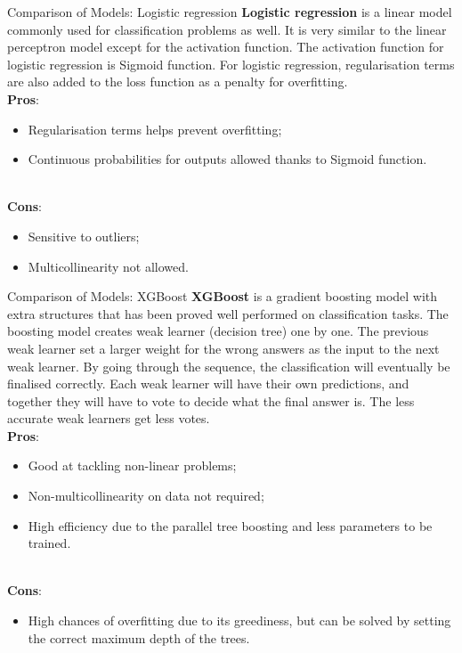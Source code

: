\begin{frame}{Comparison of Models: Logistic regression}
\textbf{Logistic regression} is a linear model commonly used for classification problems as well. It is very similar to the linear perceptron model except for the activation function. The activation function for logistic regression is Sigmoid function. For logistic regression, regularisation terms are also added to the loss function as a penalty for overfitting.
\\  \textbf{Pros}: 
\begin{itemize}
\item Regularisation terms helps prevent overfitting;
\item Continuous probabilities for outputs allowed thanks to Sigmoid function.
\end{itemize}
\\  \textbf{Cons}: 
\begin{itemize}
\item Sensitive to outliers;
\item Multicollinearity not allowed.
\end{itemize}
\end{frame}


\begin{frame}{Comparison of Models: XGBoost}
\textbf{XGBoost} is a gradient boosting model with extra structures that has been proved well performed on classification tasks. The boosting model creates weak learner (decision tree) one by one. The previous weak learner set a larger weight for the wrong answers as the input to the next weak learner. By going through the sequence, the classification will eventually be finalised correctly. Each weak learner will have their own predictions, and together they will have to vote to decide what the final answer is. The less accurate weak learners get less votes.
\\ \textbf{Pros}: 
\begin{itemize}
\item Good at tackling non-linear problems; 
\item Non-multicollinearity on data not required; 
\item High efficiency due to the parallel tree boosting and less parameters to be trained.
\end{itemize}

\\ \textbf{Cons}: 
\begin{itemize}
\item High chances of overfitting due to its greediness, but can be solved by setting the correct maximum depth of the trees.
\end{itemize}
\end{frame}

